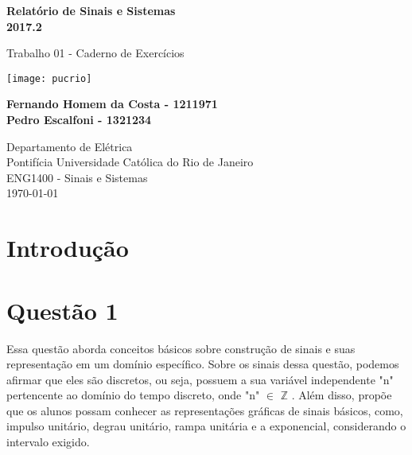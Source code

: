 \documentclass[12pt,a4paper]{article}
\begin{document}
\begin{titlepage}
	\begin{center}
		\vspace*{1cm}

		\Huge
		\textbf{Relatório de Sinais e Sistemas}\\
		\Large
		\textbf{2017.2}

		\vspace{0.5cm}
		\Large
		Trabalho 01 - Caderno de Exercícios

		\vspace{1.5cm}

		\texttt{[image: pucrio]}

		\vspace{1.5cm}

		\normalsize
		\textbf{Fernando Homem da Costa - 1211971}\\
		\textbf{Pedro Escalfoni - 1321234}

		\vfill

		\Large
		Departamento de Elétrica\\
		Pontifícia Universidade Católica do Rio de Janeiro\\
		ENG1400 - Sinais e Sistemas\\
		\today

	\end{center}
\end{titlepage}

\tableofcontents
\newpage

\section{Introdução}



\section{Questão 1}
Essa questão aborda conceitos básicos sobre construção de sinais e suas representação em um domínio específico. Sobre os sinais dessa questão, podemos afirmar que eles são discretos, ou seja, possuem a sua variável independente "n" pertencente ao domínio do tempo discreto, onde "n" $\in$  $\mathbb{Z}$ . Além disso, propõe que os alunos possam conhecer as representações gráficas de sinais básicos, como, impulso unitário, degrau unitário, rampa unitária e a exponencial, considerando o intervalo exigido.
\end{document}
